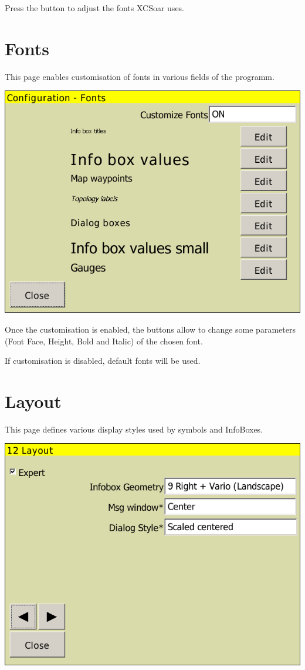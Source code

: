 Press the  button to adjust the fonts XCSoar uses.


\clearpage
\section{Fonts}

This page enables customisation of fonts in various fields of the programm.

\begin{center}
\includegraphics[angle=0,width=0.8\linewidth,keepaspectratio='true']{figures/config-fonts.png}
\end{center}

Once the customisation is enabled, the  buttons allow to change some parameters (Font 
Face, Height, Bold and Italic) of the chosen font.

If customisation is disabled, default fonts will be used.

\clearpage
\section{Layout}

This page defines various display styles used by symbols and InfoBoxes.

\begin{center}
\includegraphics[angle=0,width=0.8\linewidth,keepaspectratio='true']{figures/config-layout.png}
\end{center}


